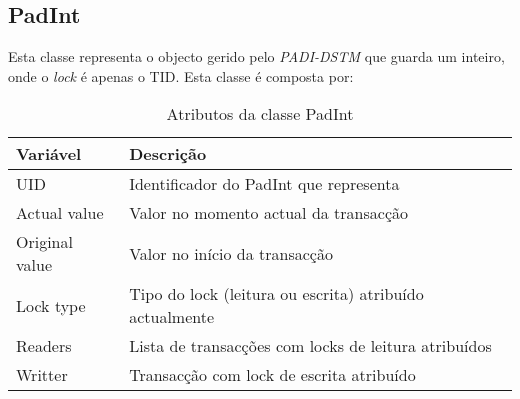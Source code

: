 \subsection{PadInt}

Esta classe representa o objecto gerido pelo \textit{PADI-DSTM} que guarda um inteiro, onde o \textit{lock} é apenas o TID. Esta classe é composta por:
\begin{table}[H]
\centering
\begin{tabular}{| p{2cm} | p{} |}
\hline
\textbf{Variável} & \textbf{Descrição} \\
\hline
UID & Identificador do PadInt que representa \\
\hline
Actual value & Valor no momento actual da transacção \\
\hline
Original value & Valor no início da transacção \\
\hline
Lock type & Tipo do lock (leitura ou escrita) atribuído actualmente\\
\hline
Readers & Lista de transacções com locks de leitura atribuídos \\
\hline
Writter & Transacção com lock de escrita atribuído\\
\hline
\end{tabular}
\caption{Atributos da classe PadInt}\label{tab:padint}
\end{table}
